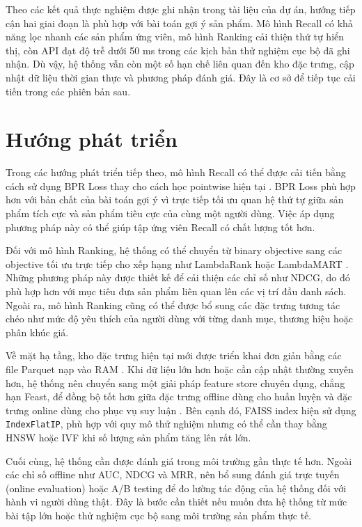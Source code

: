 Theo các kết quả thực nghiệm được ghi nhận trong tài liệu của dự án, hướng tiếp cận hai giai đoạn là phù hợp với bài toán gợi ý sản phẩm. Mô hình Recall có khả năng lọc nhanh các sản phẩm ứng viên, mô hình Ranking cải thiện thứ tự hiển thị, còn API đạt độ trễ dưới 50 ms trong các kịch bản thử nghiệm cục bộ đã ghi nhận. Dù vậy, hệ thống vẫn còn một số hạn chế liên quan đến kho đặc trưng, cập nhật dữ liệu thời gian thực và phương pháp đánh giá. Đây là cơ sở để tiếp tục cải tiến trong các phiên bản sau.

\section{Hướng phát triển}
Trong các hướng phát triển tiếp theo, mô hình Recall có thể được cải tiến bằng cách sử dụng BPR Loss thay cho cách học pointwise hiện tại \cite{rendle2009bpr}. BPR Loss phù hợp hơn với bản chất của bài toán gợi ý vì trực tiếp tối ưu quan hệ thứ tự giữa sản phẩm tích cực và sản phẩm tiêu cực của cùng một người dùng. Việc áp dụng phương pháp này có thể giúp tập ứng viên Recall có chất lượng tốt hơn.
\medskip

Đối với mô hình Ranking, hệ thống có thể chuyển từ binary objective sang các objective tối ưu trực tiếp cho xếp hạng như LambdaRank hoặc LambdaMART \cite{burges2010lambdamart}. Những phương pháp này được thiết kế để cải thiện các chỉ số như NDCG, do đó phù hợp hơn với mục tiêu đưa sản phẩm liên quan lên các vị trí đầu danh sách. Ngoài ra, mô hình Ranking cũng có thể được bổ sung các đặc trưng tương tác chéo như mức độ yêu thích của người dùng với từng danh mục, thương hiệu hoặc phân khúc giá.
\medskip

Về mặt hạ tầng, kho đặc trưng hiện tại mới được triển khai đơn giản bằng các file Parquet nạp vào RAM \cite{apacheparquet2026docs}. Khi dữ liệu lớn hơn hoặc cần cập nhật thường xuyên hơn, hệ thống nên chuyển sang một giải pháp feature store chuyên dụng, chẳng hạn Feast, để đồng bộ tốt hơn giữa đặc trưng offline dùng cho huấn luyện và đặc trưng online dùng cho phục vụ suy luận \cite{feast2026docs}. Bên cạnh đó, FAISS index hiện sử dụng \texttt{IndexFlatIP}, phù hợp với quy mô thử nghiệm nhưng có thể cần thay bằng HNSW hoặc IVF khi số lượng sản phẩm tăng lên rất lớn.
\medskip

Cuối cùng, hệ thống cần được đánh giá trong môi trường gần thực tế hơn. Ngoài các chỉ số offline như AUC, NDCG và MRR, nên bổ sung đánh giá trực tuyến (online evaluation) hoặc A/B testing để đo lường tác động của hệ thống đối với hành vi người dùng thật. Đây là bước cần thiết nếu muốn đưa hệ thống từ mức bài tập lớn hoặc thử nghiệm cục bộ sang môi trường sản phẩm thực tế.
